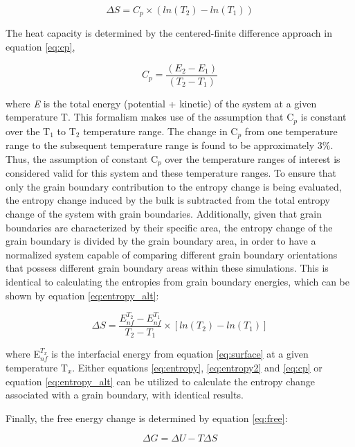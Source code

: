 \documentclass[review]{elsarticle}
\begin{document}
\begin{equation}
\label{eq:entropy2}
\Delta S = C_{p} \times (ln(T_{2}) - ln(T_{1})) 
\end{equation}

The heat capacity is determined by the centered-finite difference approach in equation \ref{eq:cp},

\begin{equation}
\label{eq:cp}
C_{p} = \frac{(E_{2} - E_{1})}{(T_{2} - T_{1})} 
\end{equation}

where \textit{E} is the total energy (potential + kinetic) of the system at a given temperature T. This formalism makes use of the assumption that C$_{p}$ is constant over the T$_{1}$ to T$_{2}$ temperature range. The change in C$_{p}$ from one temperature range to the subsequent temperature range is found to be approximately 3$\%$. Thus, the assumption of constant C$_{p}$ over the temperature ranges of interest is considered valid for this system and these temperature ranges. To ensure that only the grain boundary contribution to the entropy change is being evaluated, the entropy change induced by the bulk is subtracted from the total entropy change of the system with grain boundaries. Additionally, given that grain boundaries are characterized by their specific area, the entropy change of the grain boundary is divided by the grain boundary area, in order to have a normalized system capable of comparing different grain boundary orientations that possess different grain boundary areas within these simulations. This is identical to calculating the entropies from grain boundary energies, which can be shown by equation \ref{eq:entropy_alt}:

\begin{equation}
\label{eq:entropy_alt}
\Delta S =\frac{ E_{nf}^{T_2} - E_{nf}^{T_1}}{T_2 - T_1} \times [ ln(T_2) - ln(T_1) ]
\end{equation}

where E$_{nf}^{T_{x}}$ is the interfacial energy from equation \ref{eq:surface} at a given temperature T$_x$. Either equations \ref{eq:entropy}, \ref{eq:entropy2} and \ref{eq:cp} or equation \ref{eq:entropy_alt} can be utilized to calculate the entropy change associated with a grain boundary, with identical results. 

Finally, the free energy change is determined by equation \ref{eq:free}:

\begin{equation}
\label{eq:free}
\Delta G = \Delta U - T \Delta S
\end{equation}
\end{document}
